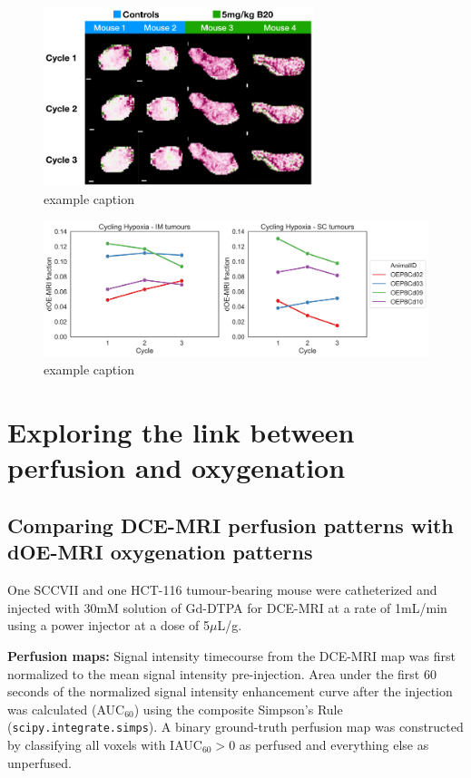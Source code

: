\begin{figure}[htbp]
   \centering
   \includegraphics[width=0.7\textwidth]{futurework/futurework-images/99_3_cychypox.png} %
   \caption{example caption}
   \label{}
\end{figure}
\begin{figure}[htbp]
   \centering
   \includegraphics[width=\textwidth]{futurework/futurework-images/99_4_OEP8_CyclingHypoxia.png} %
   \caption{example caption}
   \label{fig:example}
\end{figure}

\section{Exploring the link between perfusion and oxygenation}

\subsection{Comparing DCE-MRI perfusion patterns with \ac{dOE-MRI} oxygenation patterns}

One SCCVII and one HCT-116 tumour-bearing mouse were catheterized and injected with 30mM solution of Gd-DTPA for DCE-MRI at a rate of 1mL/min using a power injector at a dose of 5$\mu$L/g.

\noindent\textbf{Perfusion maps:} Signal intensity timecourse from the DCE-MRI map was first normalized to the mean signal intensity pre-injection.
Area under the first 60 seconds of the normalized signal intensity enhancement curve after the injection was calculated (\acs{AUC}$_{60}$) using the composite Simpson's Rule (\texttt{scipy.integrate.simps}).
A binary ground-truth perfusion map was constructed by classifying all voxels with IAUC$_{60} > 0$ as perfused and everything else as unperfused.


